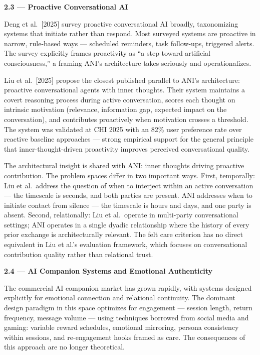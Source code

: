 \textbf{2.3 --- Proactive Conversational AI}

Deng et al.~{[}2025{]} survey proactive conversational AI broadly,
taxonomizing systems that initiate rather than respond. Most surveyed
systems are proactive in narrow, rule-based ways --- scheduled
reminders, task follow-ups, triggered alerts. The survey explicitly
frames proactivity as ``a step toward artificial consciousness,'' a
framing ANI's architecture takes seriously and operationalizes.

Liu et al.~{[}2025{]} propose the closest published parallel to ANI's
architecture: proactive conversational agents with inner thoughts. Their
system maintains a covert reasoning process during active conversation,
scores each thought on intrinsic motivation (relevance, information gap,
expected impact on the conversation), and contributes proactively when
motivation crosses a threshold. The system was validated at CHI 2025
with an 82\% user preference rate over reactive baseline approaches ---
strong empirical support for the general principle that
inner-thought-driven proactivity improves perceived conversational
quality.

The architectural insight is shared with ANI: inner thoughts driving
proactive contribution. The problem spaces differ in two important ways.
First, temporally: Liu et al.~address the question of when to interject
within an active conversation --- the timescale is seconds, and both
parties are present. ANI addresses when to initiate contact from silence
--- the timescale is hours and days, and one party is absent. Second,
relationally: Liu et al.~operate in multi-party conversational settings;
ANI operates in a single dyadic relationship where the history of every
prior exchange is architecturally relevant. The felt care criterion has
no direct equivalent in Liu et al.'s evaluation framework, which focuses
on conversational contribution quality rather than relational trust.

\textbf{2.4 --- AI Companion Systems and Emotional Authenticity}

The commercial AI companion market has grown rapidly, with systems
designed explicitly for emotional connection and relational continuity.
The dominant design paradigm in this space optimizes for engagement ---
session length, return frequency, message volume --- using techniques
borrowed from social media and gaming: variable reward schedules,
emotional mirroring, persona consistency within sessions, and
re-engagement hooks framed as care. The consequences of this approach
are no longer theoretical.

